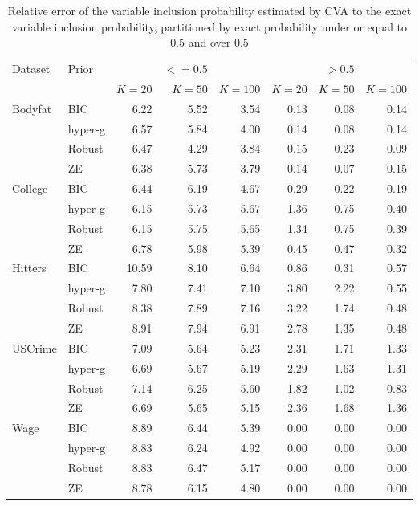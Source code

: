 \documentclass{amsart}[12pt]
\begin{document}
\begin{table}\label{tab:variable_inclusion_rel_error}
\caption{Relative error of the variable inclusion probability estimated by CVA to the
					exact variable inclusion probability, partitioned by exact probability under or equal to $0.5$ and
					over $0.5$}
\begin{tabular}{|ll|rrr|rrr|}
	\hline
	Dataset & Prior & & $<=0.5$ & & & $>0.5$ &\\
	& & $K = 20$ & $K = 50$ & $K = 100$ & $K = 20$ & $K = 50$ & $K = 100$ \\
	\hline
	Bodyfat & BIC & 6.22 & 5.52 & 3.54 & 0.13 & 0.08 & 0.14 \\
	 & hyper-g & 6.57 & 5.84 & 4.00 & 0.14 & 0.08 & 0.14 \\
	 & Robust & 6.47 & 4.29 & 3.84 & 0.15 & 0.23 & 0.09 \\
	 & ZE & 6.38 & 5.73 & 3.79 & 0.14 & 0.07 & 0.15 \\
	College & BIC & 6.44 & 6.19 & 4.67 & 0.29 & 0.22 & 0.19 \\
	 & hyper-g & 6.15 & 5.73 & 5.67 & 1.36 & 0.75 & 0.40 \\
	 & Robust & 6.15 & 5.75 & 5.65 & 1.34 & 0.75 & 0.39 \\
	 & ZE & 6.78 & 5.98 & 5.39 & 0.45 & 0.47 & 0.32 \\
	Hitters & BIC & 10.59 & 8.10 & 6.64 & 0.86 & 0.31 & 0.57 \\
	 & hyper-g & 7.80 & 7.41 & 7.10 & 3.80 & 2.22 & 0.55 \\
	 & Robust & 8.38 & 7.89 & 7.16 & 3.22 & 1.74 & 0.48 \\
	 & ZE & 8.91 & 7.94 & 6.91 & 2.78 & 1.35 & 0.48 \\
	USCrime & BIC & 7.09 & 5.64 & 5.23 & 2.31 & 1.71 & 1.33 \\
	 & hyper-g & 6.69 & 5.67 & 5.19 & 2.29 & 1.63 & 1.31 \\
	 & Robust & 7.14 & 6.25 & 5.60 & 1.82 & 1.02 & 0.83 \\
	 & ZE & 6.69 & 5.65 & 5.15 & 2.36 & 1.68 & 1.36 \\
	Wage & BIC & 8.89 & 6.44 & 5.39 & 0.00 & 0.00 & 0.00 \\
	 & hyper-g & 8.83 & 6.24 & 4.92 & 0.00 & 0.00 & 0.00 \\
	 & Robust & 8.83 & 6.47 & 5.17 & 0.00 & 0.00 & 0.00 \\
	 & ZE & 8.78 & 6.15 & 4.80 & 0.00 & 0.00 & 0.00 \\
	\hline
\end{tabular}
\end{table}
\end{document}
